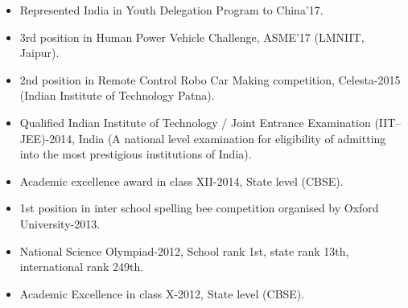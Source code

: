 \documentclass[10pt,a4paper]{altacv}
\begin{document}











\begin{fullwidth}
\end{fullwidth}
\begin{itemize}
\item  Represented India in Youth Delegation Program to China'17.
\item  3rd position in Human Power Vehicle Challenge, ASME'17 (LMNIIT, Jaipur).
\item  2nd position in Remote Control Robo Car Making competition, Celesta-2015 (Indian Institute of Technology Patna).
\item Qualified Indian Institute of Technology / Joint Entrance Examination (IIT–JEE)-2014, India (A national level examination for eligibility of admitting into the most prestigious institutions of India).
\item Academic excellence award in class XII-2014, State level (CBSE).
\item 1st position in inter school spelling bee competition organised by Oxford University-2013. 
\item National Science Olympiad-2012, School rank 1st, state rank 13th, international rank 249th.
\item Academic Excellence in class X-2012, State level (CBSE).


\end{itemize}

\end{document}
